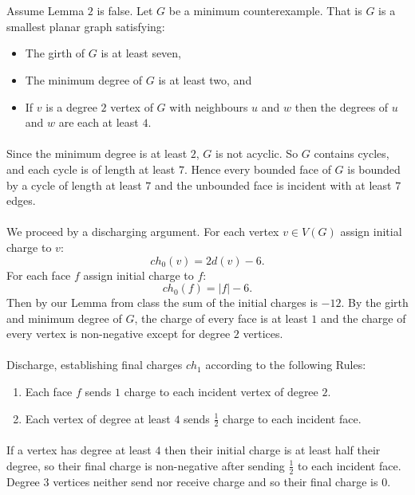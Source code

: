\documentclass[letterpaper,12pt,oneside,onecolumn]{article}
\begin{document}
\newpage
\section{}
\paragraph{}
Assume Lemma $2$ is false. Let $G$ be a minimum counterexample. That is $G$ is a smallest planar graph satisfying:
\begin{itemize}
	\item The girth of $G$ is at least seven,
	\item The minimum degree of $G$ is at least two, and
	\item If $v$ is a degree $2$ vertex of $G$ with neighbours $u$ and $w$ then the degrees of $u$ and $w$ are each at least $4$.
\end{itemize}  
\paragraph{}
Since the minimum degree is at least $2$, $G$ is not acyclic. So $G$ contains cycles, and each cycle is of length at least $7$. Hence every bounded face of $G$ is bounded by a cycle of length at least $7$ and the unbounded face is incident with at least $7$ edges.
\paragraph{}
We proceed by a discharging argument. For each vertex $v \in V(G)$ assign initial charge to $v$:
$$ch_0(v) = 2d(v) - 6.$$
For each face $f$ assign initial charge to $f$:
$$ch_0(f) = |f| - 6.$$
Then by our Lemma from class the sum of the initial charges is $-12$. By the girth and minimum degree of $G$, the charge of every face is at least $1$ and the charge of every vertex is non-negative except for degree $2$ vertices.
\paragraph{}
Discharge, establishing final charges $ch_1$ according to the following Rules:
\begin{enumerate}
	\item Each face $f$ sends $1$ charge to each incident vertex of degree $2$.
	\item Each vertex of degree at least $4$ sends $\frac{1}{2}$ charge to each incident face.
\end{enumerate}
\paragraph{}
If a vertex has degree at least $4$ then their initial charge is at least half their degree, so their final charge is non-negative after sending $\frac{1}{2}$ to each incident face. Degree $3$ vertices neither send nor receive charge and so their final charge is $0$.
\end{document}
